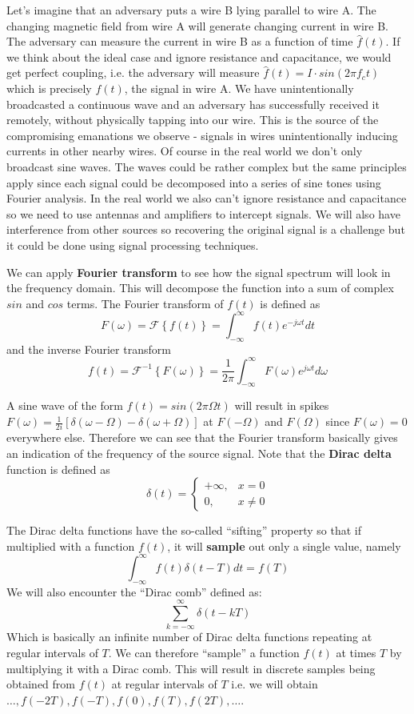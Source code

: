 \documentclass[a4paper,12pt,twoside,openright]{report}
\begin{document}
Let's imagine that an adversary puts a wire B lying parallel to wire A. The changing magnetic field from wire A will generate changing current in wire B. The adversary can measure the current in wire B as a function of time $\hat{f}(t)$. If we think about the ideal case and ignore resistance and capacitance, we would get perfect coupling, i.e. the adversary will measure $\hat{f}(t) = I \cdot sin(2\pi f_{c} t)$ which is precisely $f(t)$, the signal in wire A. We have unintentionally broadcasted a continuous wave and an adversary has successfully received it remotely, without physically tapping into our wire. This is the source of the compromising emanations we observe - signals in wires unintentionally inducing currents in other nearby wires. Of course in the real world we don't only broadcast sine waves. The waves could be rather complex but the same principles apply since each signal could be decomposed into a series of sine tones using Fourier analysis. In the real world we also can't ignore resistance and capacitance so we need to use antennas and amplifiers to intercept signals. We will also have interference from other sources so recovering the original signal is a challenge but it could be done using signal processing techniques.

We can apply \textbf{Fourier transform}\cite{briggs1995dft} to see how the signal spectrum will look in the frequency domain. This will decompose the function into a sum of complex $sin$ and $cos$ terms. The Fourier transform of $f(t)$ is defined as
$$F(\omega)=\mathcal{F} \left\{ f(t) \right\} = \int_{-\infty}^{\infty} f(t) e^{-j \omega t} dt $$
and the inverse Fourier transform
$$f(t) = \mathcal{F}^{-1} \left\{ F(\omega) \right\} = \frac{1}{2\pi} \int_{-\infty}^{\infty} F(\omega) e^{j \omega t} d\omega$$

A sine wave of the form $f(t) = sin(2 \pi \Omega t)$ will result in spikes $F(\omega) = \frac{1}{2 i} [\delta(\omega - \Omega) - \delta(\omega
 + \Omega)]$ at $F(-\Omega)$ and $F(\Omega)$ since $F(\omega) = 0$ everywhere else. Therefore we can see that the Fourier transform basically gives an indication of the frequency of the source signal. Note that the \textbf{Dirac delta} function is defined as
$$ \delta(t) = \begin{cases} +\infty, & x = 0 \\ 0, & x \neq 0 \end{cases} $$

The Dirac delta functions have the so-called ``sifting'' property so that if multiplied with a function $f(t)$, it will \textbf{sample} out only a single value, namely
$$ \int_{-\infty}^{\infty} f(t) \delta(t - T) dt = f(T) $$
We will also encounter the ``Dirac comb'' defined as:
$$ \sum_{k=-\infty}^{\infty} \delta(t - kT) $$
Which is basically an infinite number of Dirac delta functions repeating at regular intervals of $T$. We can therefore ``sample'' a function $f(t)$ at times $T$ by multiplying it with a Dirac comb. This will result in discrete samples being obtained from $f(t)$ at regular intervals of $T$ i.e. we will obtain $\dots, f(-2 T), f(-T), f(0), f(T), f(2 T), \dots$.
\end{document}
